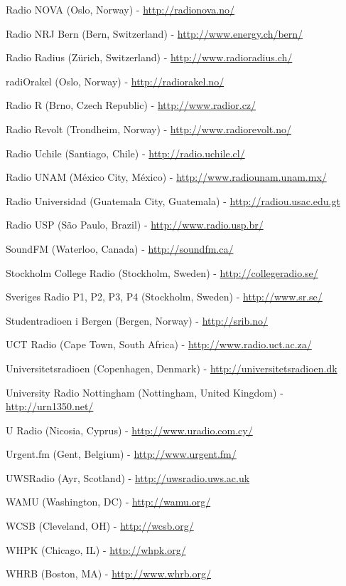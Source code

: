 \documentclass[20pt,landscape]{foils}
\begin{document}
\begin{list1}
\begin{list2}
  \item Radio NOVA (Oslo, Norway) - \url{http://radionova.no/}
  \item Radio NRJ Bern (Bern, Switzerland) - \url{http://www.energy.ch/bern/}
  \item Radio Radius (Zürich, Switzerland) - \url{http://www.radioradius.ch/}
  \item radiOrakel (Oslo, Norway) - \url{http://radiorakel.no/}
  \item Radio R (Brno, Czech Republic) - \url{http://www.radior.cz/}
  \item Radio Revolt (Trondheim, Norway) - \url{http://www.radiorevolt.no/}
  \item Radio Uchile (Santiago, Chile) - \url{http://radio.uchile.cl/}
  \item Radio UNAM (México City, México) - \url{http://www.radiounam.unam.mx/}
  \item Radio Universidad (Guatemala City, Guatemala) - \url{http://radiou.usac.edu.gt}
  \item Radio USP (São Paulo, Brazil) - \url{http://www.radio.usp.br/}
  \item SoundFM (Waterloo, Canada) - \url{http://soundfm.ca/}
  \item Stockholm College Radio (Stockholm, Sweden) - \url{http://collegeradio.se/}
  \item Sveriges Radio P1, P2, P3, P4 (Stockholm, Sweden) - \url{http://www.sr.se/}    
  \item Studentradioen i Bergen (Bergen, Norway) - \url{http://srib.no/}
  \item UCT Radio (Cape Town, South Africa) - \url{http://www.radio.uct.ac.za/}
  \item Universitetsradioen (Copenhagen, Denmark) - \url{http://universitetsradioen.dk}
  \item University Radio Nottingham (Nottingham, United Kingdom) - \url{http://urn1350.net/}
  \item U Radio (Nicosia, Cyprus) - \url{http://www.uradio.com.cy/}
  \item Urgent.fm (Gent, Belgium) - \url{http://www.urgent.fm/}
  \item UWSRadio (Ayr, Scotland) - \url{http://uwsradio.uws.ac.uk}
  \item WAMU (Washington, DC) - \url{http://wamu.org/}
  \item WCSB (Cleveland, OH) - \url{http://wcsb.org/}
  \item WHPK (Chicago, IL) - \url{http://whpk.org/}
  \item WHRB (Boston, MA) - \url{http://www.whrb.org/}

\end{list2}
\end{list1}
\end{document}
